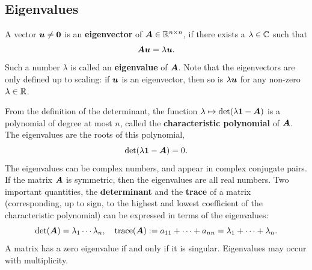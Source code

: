 \documentclass[11pt,a4paper]{memoir}
\begin{document}
\subsection{Eigenvalues}
A vector $\bm{u}\neq \bm{0}$ is an \textbf{eigenvector} of $\bm{A}\in \mathbb{R}^{n\times n}$, if there exists a $\lambda\in \mathbb{C}$ such that
\begin{equation*}
 \bm{A}\bm{u} = \lambda \bm{u}.
\end{equation*}
Such a number $\lambda$ is called an \textbf{eigenvalue} of $\bm{A}$. Note that the eigenvectors are only defined up to scaling: if $\bm{u}$ is an eigenvector, then so is $\lambda \bm{u}$ for any non-zero $\lambda\in \mathbb{R}$.

From the definition of the determinant, the function
$\lambda \mapsto \det(\lambda \bm{1}-\bm{A})$ is a polynomial of degree at most $n$, called the \textbf{characteristic polynomial} of $\bm{A}$. The eigenvalues are the roots of \strictpagecheck{} this polynomial,
\begin{equation*}
 \det(\lambda \bm{1}-\bm{A}) = 0.
\end{equation*}
The eigenvalues can be complex numbers, and appear in complex conjugate pairs. If the matrix $\bm{A}$ is symmetric, then the eigenvalues are all real numbers. Two important quantities, the \textbf{determinant} and the \textbf{trace} of a matrix (corresponding, up to sign, to the highest and lowest coefficient of the characteristic polynomial) can be expressed in terms of the eigenvalues:
\begin{equation*}
 \det(\bm{A}) = \lambda_1\cdots \lambda_n, \quad \mathrm{trace}(\bm{A}) := a_{11}+\cdots +a_{nn} = \lambda_1+\cdots+\lambda_n.
\end{equation*}
A matrix has a zero eigenvalue if and only if it is singular. Eigenvalues may occur with multiplicity. 
\end{document}
